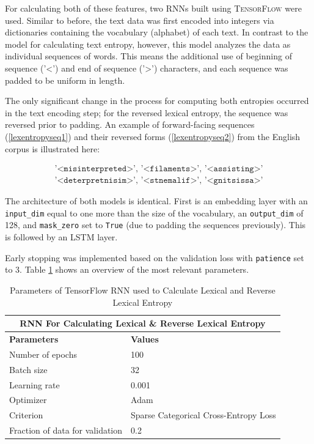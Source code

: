 \documentclass[12pt,a4paper]{article}
\numberwithin{figure}{section}
\numberwithin{table}{section}
\numberwithin{definition}{section}
\begin{document}
For calculating both of these features, two RNNs built using \textsc{TensorFlow} were used. Similar to before, the text data was first encoded into integers via dictionaries containing the vocabulary (alphabet) of each text. In contrast to the model for calculating text entropy, however, this model analyzes the data as individual sequences of words. This means the additional use of beginning of sequence ('<') and end of sequence ('>') characters, and each sequence was padded to be uniform in length. 

The only significant change in the process for computing both entropies occurred in the text encoding step; for the reversed lexical entropy, the sequence was reversed prior to padding. An example of forward-facing sequences (\ref{lexentropyseq1}) and their reversed forms (\ref{lexentropyseq2}) from the English corpus is illustrated here:

\begin{align}
\texttt{'<misinterpreted>', '<filaments>', '<assisting>'} \label{lexentropyseq1} \\
\texttt{'<deterpretnisim>', '<stnemalif>', '<gnitsissa>'} \label{lexentropyseq2}
\end{align}

The architecture of both models is identical. First is an embedding layer with an \texttt{input\_dim} equal to one more than the size of the vocabulary, an \texttt{output\_dim} of 128, and \texttt{mask\_zero} set to \texttt{True} (due to padding the sequences previously). This is followed by an LSTM layer. 

Early stopping was implemented based on the validation loss with \texttt{patience} set to 3. Table \ref{tbl:kerasrnnparams} shows an overview of the most relevant parameters.

\begin{table}[h!] 
  \centering\small
  \renewcommand{\arraystretch}{1.5} 
  \begin{tabular}{@{}ll@{}}
  \hline
  \multicolumn{2}{|c|}{\textbf{RNN For Calculating Lexical \& Reverse Lexical Entropy}} \\
  \hline
  \textbf{Parameters} & \textbf{Values} \\
  \hline
  Number of epochs & 100 \\
  Batch size & 32 \\
  Learning rate & 0.001 \\
  Optimizer & Adam \\
  Criterion & Sparse Categorical Cross-Entropy Loss \\
  Fraction of data for validation & 0.2 \\
  \hline
  \end{tabular}
  \caption{Parameters of TensorFlow RNN used to Calculate Lexical and Reverse Lexical Entropy}
  \label{tbl:kerasrnnparams}
\end{table}
\end{document}
